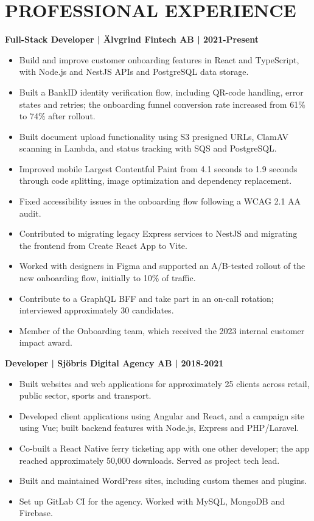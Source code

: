 \documentclass[11pt,a4paper]{article}
\begin{document}
\section*{PROFESSIONAL EXPERIENCE}
\textbf{Full-Stack Developer | Älvgrind Fintech AB | 2021-Present}
\begin{itemize}
\item Build and improve customer onboarding features in React and TypeScript, with Node.js and NestJS APIs and PostgreSQL data storage.
\item Built a BankID identity verification flow, including QR-code handling, error states and retries; the onboarding funnel conversion rate increased from 61\% to 74\% after rollout.
\item Built document upload functionality using S3 presigned URLs, ClamAV scanning in Lambda, and status tracking with SQS and PostgreSQL.
\item Improved mobile Largest Contentful Paint from 4.1 seconds to 1.9 seconds through code splitting, image optimization and dependency replacement.
\item Fixed accessibility issues in the onboarding flow following a WCAG 2.1 AA audit.
\item Contributed to migrating legacy Express services to NestJS and migrating the frontend from Create React App to Vite.
\item Worked with designers in Figma and supported an A/B-tested rollout of the new onboarding flow, initially to 10\% of traffic.
\item Contribute to a GraphQL BFF and take part in an on-call rotation; interviewed approximately 30 candidates.
\item Member of the Onboarding team, which received the 2023 internal customer impact award.
\end{itemize}

\textbf{Developer | Sjöbris Digital Agency AB | 2018-2021}
\begin{itemize}
\item Built websites and web applications for approximately 25 clients across retail, public sector, sports and transport.
\item Developed client applications using Angular and React, and a campaign site using Vue; built backend features with Node.js, Express and PHP/Laravel.
\item Co-built a React Native ferry ticketing app with one other developer; the app reached approximately 50,000 downloads. Served as project tech lead.
\item Built and maintained WordPress sites, including custom themes and plugins.
\item Set up GitLab CI for the agency. Worked with MySQL, MongoDB and Firebase.
\end{itemize}
\end{document}

